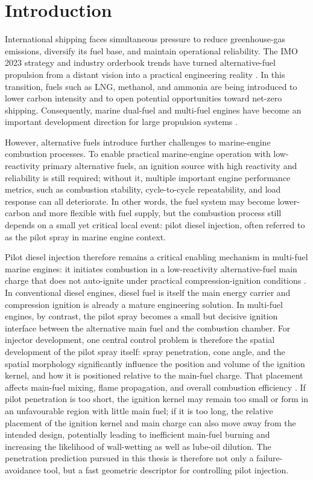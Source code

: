 \section{Introduction}

International shipping faces simultaneous pressure to reduce greenhouse-gas emissions, diversify its fuel base, and maintain operational reliability.
The IMO 2023 strategy and industry orderbook trends have turned alternative-fuel propulsion from a distant vision into a practical engineering reality
\cite{imo2023ghgstrategy,classnk2025alternativefuels}.
In this transition, fuels such as LNG, methanol, and ammonia are being introduced to lower carbon intensity
and to open potential opportunities toward net-zero shipping.
Consequently, marine dual-fuel and multi-fuel engines have become an important development direction for large propulsion systems
\cite{wingd_lng_faq_2025,wingd_ammonia_faq_2025,classnk_methanol_2024}.

However, alternative fuels introduce further challenges to marine-engine combustion processes.
To enable practical marine-engine operation with low-reactivity primary alternative fuels, an ignition source with high reactivity and reliability is still required;
without it, multiple important engine performance metrics, such as combustion stability, cycle-to-cycle repeatability, and load response can all deteriorate.
In other words, the fuel system may become lower-carbon and more flexible with fuel supply,
but the combustion process still depends on a small yet critical local event: pilot diesel injection,
often referred to as the pilot spray in marine engine context.

Pilot diesel injection therefore remains a critical enabling mechanism in multi-fuel marine engines:
it initiates combustion in a low-reactivity alternative-fuel main charge that does not auto-ignite under practical compression-ignition conditions
\cite{wingd_xdf_manual_2021,classnk_methanol_2024}.
In conventional diesel engines, diesel fuel is itself the main energy carrier
and compression ignition is already a mature engineering solution.
In multi-fuel engines, by contrast,
the pilot spray becomes a small but decisive ignition interface between the alternative main fuel and the combustion chamber.
For injector development, one central control problem is therefore the spatial development of the pilot spray itself:
spray penetration, cone angle, and the spatial morphology significantly influence the position and volume of the ignition kernel, and how it is positioned relative to the main-fuel charge.
That placement affects main-fuel mixing, flame propagation, and overall combustion efficiency
\cite{Karim2015DualFuel,WeiGeng2016DualFuelReview,Sahoo2009DualFuelReview}.
If pilot penetration is too short, the ignition kernel may remain too small or form in an unfavourable region with little main fuel;
if it is too long, the relative placement of the ignition kernel and main charge can also move away from the intended design, potentially leading to inefficient main-fuel burning and increasing the likelihood of wall-wetting as well as lube-oil dilution.
The penetration prediction pursued in this thesis is therefore not only a failure-avoidance tool, but a fast geometric descriptor for controlling pilot injection.

